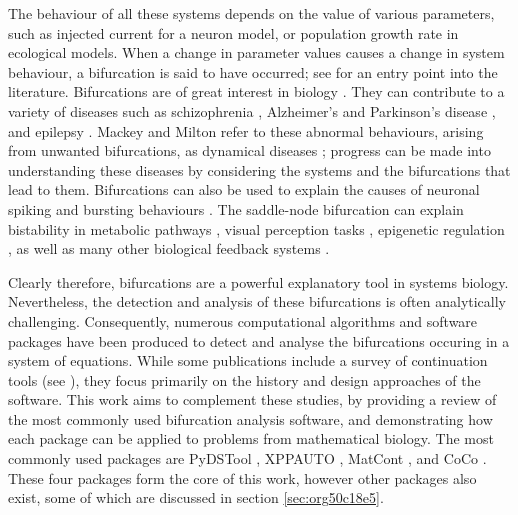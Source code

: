 \documentclass[a4paper,twoside]{article}
\begin{document}
The behaviour of all these systems depends on the value of various parameters, such as injected current for a neuron model, or population growth rate in ecological models.
When a change in parameter values causes a change in system behaviour, a bifurcation is said to have occurred; see \cite{strogatz2018nonlinear,guckenheimer2013nonlinear,kuznetsov2013elements} for an entry point into the literature.
Bifurcations are of great interest in biology \cite{guevara2003bifurcations}.
They can contribute to a variety of diseases such as schizophrenia \cite{an2006schizophrenia}, Alzheimer's and Parkinson's disease \cite{mustafa2009non}, and epilepsy \cite{da2003epilepsies,milton2000epilespy}.
Mackey and Milton refer to these abnormal behaviours, arising from unwanted bifurcations, as dynamical diseases \cite{mackey1987dynamical}; progress can be made into understanding these diseases by considering the systems and the bifurcations that lead to them.
Bifurcations can also be used to explain the causes of neuronal spiking and bursting behaviours \cite{izhikevich2000neural,izhikevich2007dynamical}.
The saddle-node bifurcation can explain bistability in metabolic pathways \cite{diaz2010bistable}, visual perception tasks \cite{chialvo1993modulated}, epigenetic regulation \cite{jost2014bifurcation}, as well as many other biological feedback systems \cite{angeli2004detection}.

Clearly therefore, bifurcations are a powerful explanatory tool in systems biology.
Nevertheless, the detection and analysis of these bifurcations is often analytically challenging.
Consequently, numerous computational algorithms and software packages have been produced to detect and analyse the bifurcations occuring in a system of equations.
While some publications include a survey of continuation tools (see \cite{meijer2009numerical,govaerts2007interactive,dhooge2008new}), they focus primarily on the history and design approaches of the software.
This work aims to complement these studies, by providing a review of the most commonly used bifurcation analysis software, and demonstrating how each package can be applied to problems from mathematical biology.
The most commonly used packages are PyDSTool \cite{clewley2012hybrid}, XPPAUTO \cite{ermentrout2002simulating}, MatCont \cite{dhooge2008new}, and CoCo \cite{dankowicz2013recipes}.
These four packages form the core of this work, however other packages also exist, some of which are discussed in section \ref{sec:org50c18e5}.
\end{document}
